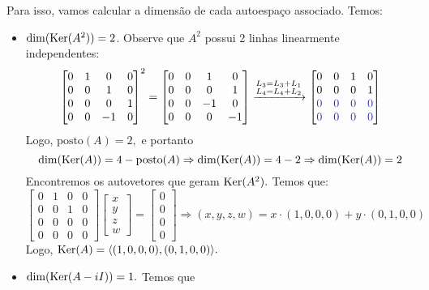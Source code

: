 \documentclass[11pt,a4paper]{article}
\begin{document}
{Para isso, vamos calcular a dimensão de cada autoespaço associado. Temos:
\begin{itemize}
    \item $\dim(\operatorname{Ker}(A^2)) =2$. Observe que $A^2$ possui 2 linhas linearmente independentes:
    \[ \begin{bmatrix}
0 & 1 & 0& 0\\
0 &0 &1 & 0 \\
0 &0 &0& 1 \\
0 & 0 & -1&0
\end{bmatrix}^2 = \begin{bmatrix}
0 & 0 & 1& 0\\
0 &0 &0 & 1 \\
0 &0 &-1& 0 \\
0 & 0 & 0&-1
\end{bmatrix}  \xrightarrow[]{\substack{L_3 = L_3 +L_1 \\L_4 = L_4 +L_2}}  \begin{bmatrix}
0 & 0 & 1& 0\\
0 &0 &0 & 1 \\
\textcolor{Blue}{0} & \textcolor{Blue}{0} & \textcolor{Blue}{0}&\textcolor{Blue}{0}\\
\textcolor{Blue}{0} & \textcolor{Blue}{0} & \textcolor{Blue}{0}&\textcolor{Blue}{0}
\end{bmatrix} 
    \]
    Logo, $\mbox{posto}(A) = 2,$ e portanto 
    \[\dim(\operatorname{Ker}(A)) = 4 - \mbox{posto}(A)  \Rightarrow \dim(\operatorname{Ker}(A)) = 4 - 2 \Rightarrow \dim(\operatorname{Ker}(A)) = 2
    \]
Encontremos os autovetores que geram $\operatorname{Ker}(A^2).$ Temos que:
\[
\begin{bmatrix}
0 & 1 & 0& 0\\
0 &0 &1 & 0 \\
0 &0 &0& 0 \\
0 & 0 & 0 & 0
\end{bmatrix} \begin{bmatrix} x \\ y \\ z \\w  \end{bmatrix} = \begin{bmatrix} 0 \\ 0 \\ 0 \\0  \end{bmatrix} \Rightarrow (x,y,z,w) = x \cdot (1,0,0,0) + y \cdot (0,1,0,0)
\]
Logo, $\operatorname{Ker}(A) = \langle (1,0,0,0), (0,1,0,0) \rangle.$
    \item $\dim(\operatorname{Ker}(A - iI)) = 1.$ Temos que

\end{itemize}}
\end{document}

